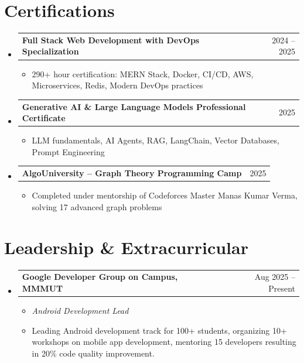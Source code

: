 \documentclass[letterpaper,11pt]{article}
\makeatletter
\newcommand{\resumeItem}[1]{
  \item\small{#1 \vspace{-2pt}}
}
\newcommand{\resumeProjectHeading}[2]{
  \item
    \begin{tabular*}{0.97\textwidth}{l@{\extracolsep{\fill}}r}
      \small#1 & #2 \\
    \end{tabular*}\vspace{-7pt}
}
\newcommand{\resumeSubHeadingListStart}{\begin{itemize}[leftmargin=0.15in, label={}]}
\newcommand{\resumeSubHeadingListEnd}{\end{itemize}}
\newcommand{\resumeItemListStart}{\begin{itemize}}
\newcommand{\resumeItemListEnd}{\end{itemize}\vspace{-5pt}}
\makeatother
\begin{document}
\section{Certifications}
  \resumeSubHeadingListStart

    \resumeProjectHeading
      {\textbf{Full Stack Web Development with DevOps Specialization} \faLink}{2024 -- 2025}
      \resumeItemListStart
        \resumeItem{290+ hour certification: MERN Stack, Docker, CI/CD, AWS, Microservices, Redis, Modern DevOps practices}
      \resumeItemListEnd

    \resumeProjectHeading
      {\textbf{Generative AI \& Large Language Models Professional Certificate} \faLink}{2025}
      \resumeItemListStart
        \resumeItem{LLM fundamentals, AI Agents, RAG, LangChain, Vector Databases, Prompt Engineering}
      \resumeItemListEnd

    \resumeProjectHeading
      {\textbf{AlgoUniversity -- Graph Theory Programming Camp} \faLink}{2025}
      \resumeItemListStart
        \resumeItem{Completed under mentorship of Codeforces Master Manas Kumar Verma, solving 17 advanced graph problems}
      \resumeItemListEnd

  \resumeSubHeadingListEnd

\section{Leadership \& Extracurricular}
  \resumeSubHeadingListStart

    \resumeProjectHeading
      {\textbf{Google Developer Group on Campus, MMMUT}}{Aug 2025 -- Present}
      \resumeItemListStart
        \resumeItem{\textit{Android Development Lead}}
        \resumeItem{Leading Android development track for 100+ students, organizing 10+ workshops on mobile app development, mentoring 15 developers resulting in 20\% code quality improvement.}
      \resumeItemListEnd

  \resumeSubHeadingListEnd
\end{document}

